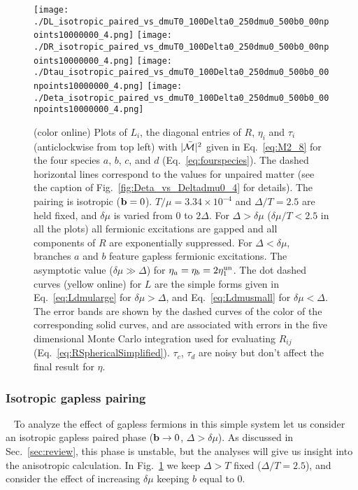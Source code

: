 \documentclass[10pt, aps, prd, superscriptaddress, nofootinbib, 
               amsmath, amssymb, twocolumn,
               preprintnumbers, showpacs,
               raggedbottom,
               floatfix]{revtex4-1}
\newcommand{\calM}{{\cal{M}}}
\newcommand{\bfb}{{\bf{b}}}
\newcommand{\un}{{\rm{un}}}
\begin{document}
\begin{figure*}[tbp]
\texttt{[image: ./DL\_isotropic\_paired\_vs\_dmuT0\_100Delta0\_250dmu0\_500b0\_00npoints10000000\_4.png]}
\texttt{[image: ./DR\_isotropic\_paired\_vs\_dmuT0\_100Delta0\_250dmu0\_500b0\_00npoints10000000\_4.png]}
\texttt{[image: ./Dtau\_isotropic\_paired\_vs\_dmuT0\_100Delta0\_250dmu0\_500b0\_00npoints10000000\_4.png]}
\texttt{[image: ./Deta\_isotropic\_paired\_vs\_dmuT0\_100Delta0\_250dmu0\_500b0\_00npoints10000000\_4.png]}
  \caption{(color online) Plots of $L_i$, the diagonal entries of $R$, $\eta_i$
  and $\tau_i$ (anticlockwise from top left) with $|\bar{\calM}|^2$ given in
  Eq.~\ref{eq:M2_8} for the four species $a$, $b$, $c$, and $d$
  (Eq.~\ref{eq:fourspecies}). The dashed horizontal lines correspond to the
  values for unpaired matter (see the caption of
  Fig.~\ref{fig:Deta_vs_Deltadmu0_4} for details). The pairing is isotropic
  ($\bfb=0$).  $T/\mu=3.34\times10^{-4}$ and $\Delta/T=2.5$ are held fixed, and
  $\delta\mu$ is varied from $0$ to $2\Delta$. For $\Delta>\delta\mu$
  ($\delta\mu/T<2.5$ in all the plots) all fermionic excitations are gapped and
  all components of $R$ are exponentially suppressed. For $\Delta<\delta\mu$,
  branches $a$ and $b$ feature gapless fermionic excitations. The asymptotic
  value ($\delta\mu\gg\Delta$) for $\eta_a=\eta_b=2\eta^\un_1$. The dot dashed
  curves (yellow online) for $L$ are the simple forms given in
  Eq.~\ref{eq:Ldmularge} for $\delta\mu>\Delta$, and Eq.~\ref{eq:Ldmusmall} for
  $\delta\mu<\Delta$. The error bands are shown by the dashed curves of the
  color of the corresponding solid curves, and are associated with errors in
  the five dimensional Monte Carlo integration used for evaluating $R_{ij}$
  (Eq.~\ref{eq:RSphericalSimplified}).  $\tau_c$, $\tau_d$ are noisy but don't
  affect the final result for $\eta$.  ~\label{fig:Deta_vs_dmuDelta0250_4}
}
\end{figure*}

\subsubsection{Isotropic gapless pairing}
~\label{subsubsec:dmunonzero}
To analyze the effect of gapless fermions in this simple system let us consider an
isotropic gapless paired phase ($\bfb\rightarrow 0$, $\Delta>\delta\mu$). As
discussed in Sec.~\ref{sec:review},
this phase is unstable, but the analyses will give us insight into the
anisotropic calculation. In Fig.~\ref{fig:Deta_vs_dmuDelta0250_4} we keep 
$\Delta>T$ fixed ($\Delta/T=2.5$), and consider the effect of increasing 
$\delta\mu$ keeping $b$ equal to $0$.
\end{document}
